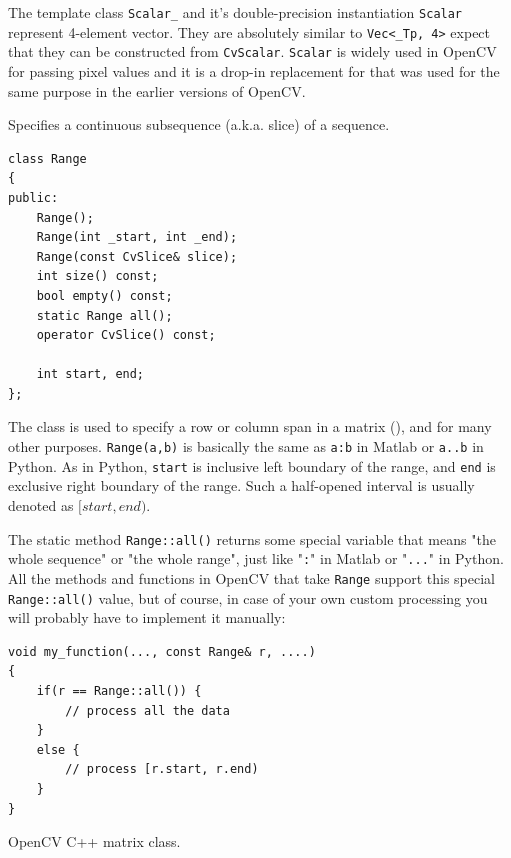 The template class \texttt{Scalar\_} and it's double-precision instantiation \texttt{Scalar} represent 4-element vector. They are absolutely similar to \texttt{Vec<\_Tp, 4>} expect that they can be constructed from \texttt{CvScalar}. \texttt{Scalar} is widely used in OpenCV for passing pixel values and it is a drop-in replacement for  that was used for the same purpose in the earlier versions of OpenCV.

\label{Range}
Specifies a continuous subsequence (a.k.a. slice) of a sequence.

\begin{lstlisting}
class Range
{
public:
    Range();
    Range(int _start, int _end);
    Range(const CvSlice& slice);
    int size() const;
    bool empty() const;
    static Range all();
    operator CvSlice() const;

    int start, end;
};
\end{lstlisting}

The class is used to specify a row or column span in a matrix (), and for many other purposes. \texttt{Range(a,b)} is basically the same as \texttt{a:b} in Matlab or \texttt{a..b} in Python. As in Python, \texttt{start} is inclusive left boundary of the range, and \texttt{end} is exclusive right boundary of the range. Such a half-opened interval is usually denoted as $[start,end)$.

The static method \texttt{Range::all()} returns some special variable that means "the whole sequence" or "the whole range", just like "\texttt{:}" in Matlab or "\texttt{...}" in Python. All the methods and functions in OpenCV that take \texttt{Range} support this special \texttt{Range::all()} value, but of course, in case of your own custom processing you will probably have to implement it manually:
\begin{lstlisting}
void my_function(..., const Range& r, ....)
{
    if(r == Range::all()) {
        // process all the data
    }
    else {
        // process [r.start, r.end)
    } 
}
\end{lstlisting}

\label{Mat}

OpenCV C++ matrix class.

